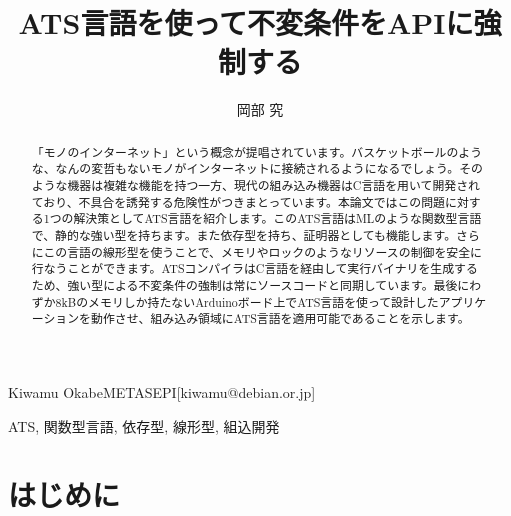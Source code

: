 \documentclass{ipsjprosym}
\begin{document}
\title{ATS言語を使って不変条件をAPIに強制する}


\author{岡部 究}{Kiwamu Okabe}{METASEPI}[kiwamu@debian.or.jp]

\begin{abstract}
「モノのインターネット」という概念が提唱されています。バスケットボールのような、なんの変哲もないモノがインターネットに接続されるようになるでしょう。そのような機器は複雑な機能を持つ一方、現代の組み込み機器はC言語を用いて開発されており、不具合を誘発する危険性がつきまとっています。本論文ではこの問題に対する1つの解決策としてATS言語を紹介します。このATS言語はMLのような関数型言語で、静的な強い型を持ちます。また依存型を持ち、証明器としても機能します。さらにこの言語の線形型を使うことで、メモリやロックのようなリソースの制御を安全に行なうことができます。ATSコンパイラはC言語を経由して実行バイナリを生成するため、強い型による不変条件の強制は常にソースコードと同期しています。最後にわずか8kBのメモリしか持たないArduinoボード上でATS言語を使って設計したアプリケーションを動作させ、組み込み領域にATS言語を適用可能であることを示します。
\end{abstract}

\begin{jkeyword}
ATS, 関数型言語, 依存型, 線形型, 組込開発
\end{jkeyword}

\maketitle

\section{はじめに}
\end{document}
